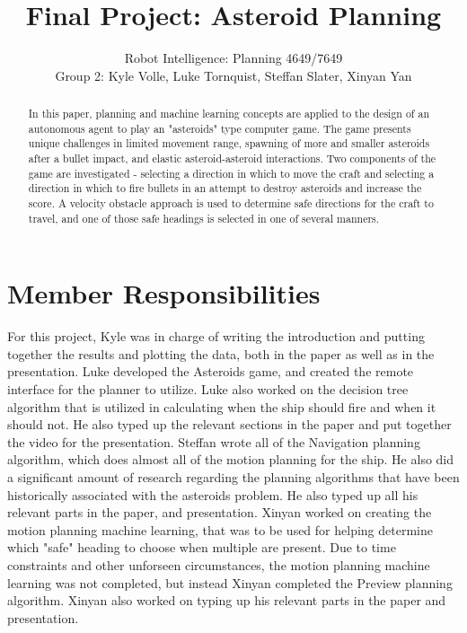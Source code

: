 \documentclass[10pt,draft,conference]{IEEEtran}
\begin{document}
\title{Final Project: Asteroid Planning}
\author{Robot Intelligence: Planning 4649/7649 \\
Group 2: Kyle Volle, Luke Tornquist, Steffan Slater, Xinyan Yan}
\maketitle


\newpage

\nocite{*}

\begin{abstract}
In this paper, planning and machine learning concepts are applied to the design of an autonomous agent to play an "asteroids" type computer game. The game presents unique challenges in limited movement range, spawning of more and smaller asteroids after a bullet impact, and elastic asteroid-asteroid interactions. Two components of the game are investigated - selecting a direction in which to move the craft and selecting a direction in which to fire bullets in an attempt to destroy asteroids and increase the score. A velocity obstacle approach is used to determine safe directions for the craft to travel, and one of those safe headings is selected in one of several manners.
\end{abstract}

\section{Member Responsibilities}
For this project, Kyle was in charge of writing the introduction and putting together the results and plotting the data, both in the paper as well as in the presentation.  Luke developed the Asteroids game, and created the remote interface for the planner to utilize.  Luke also worked on the decision tree algorithm that is utilized in calculating when the ship should fire and when it should not.  He also typed up the relevant sections in the paper and put together the video for the presentation.  Steffan wrote all of the Navigation planning algorithm, which does almost all of the motion planning for the ship.  He also did a significant amount of research regarding the planning algorithms that have been historically associated with the asteroids problem.  He also typed up all his relevant parts in the paper, and presentation.  Xinyan worked on creating the motion planning machine learning, that was to be used for helping determine which "safe" heading to choose when multiple are present.  Due to time constraints and other unforseen circumstances, the motion planning machine learning was not completed, but instead Xinyan completed the Preview planning algorithm.  Xinyan also worked on typing up his relevant parts in the paper and presentation.
\end{document}
